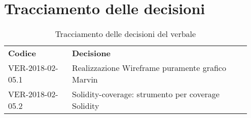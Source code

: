 \documentclass[VER-2018-05-02.tex]{subfiles}
\begin{document}
\section{Tracciamento delle decisioni}
\begin{table}[H]
	\begin{center}
		\begin{tabu} to 
			\tableHeaderStyle
			\textbf{Codice} & \textbf{Decisione} \\
			VER-2018-02-05.1 & Realizzazione Wireframe puramente grafico Marvin \\
			VER-2018-02-05.2 & Solidity-coverage: strumento per coverage Solidity \\
		\end{tabu}
		\caption{Tracciamento delle decisioni del verbale}
	\end{center}
\end{table}
\end{document}
